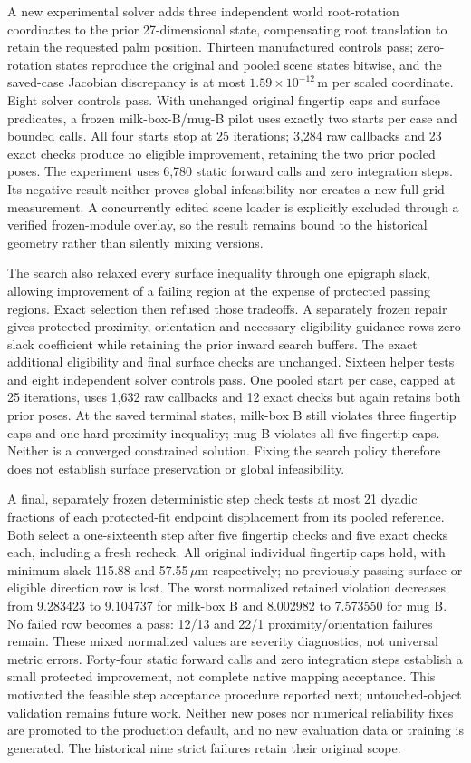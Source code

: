 \documentclass[10pt,letterpaper]{article}
\begin{document}
A new experimental solver adds three independent world root-rotation
coordinates to the prior 27-dimensional state, compensating root translation
to retain the requested palm position. Thirteen manufactured controls pass;
zero-rotation states reproduce the original and pooled scene states bitwise,
and the saved-case Jacobian discrepancy is at most
$1.59\times10^{-12}$\,m per scaled coordinate. Eight solver controls pass.
With unchanged original fingertip caps and surface predicates, a frozen
milk-box-B/mug-B pilot uses exactly two starts per case and bounded calls.
All four starts stop at 25 iterations; 3,284 raw callbacks and 23 exact checks
produce no eligible improvement, retaining the two prior pooled poses.
The experiment uses 6,780 static forward calls and zero integration steps.
Its negative result neither proves global infeasibility nor creates a new
full-grid measurement. A concurrently edited scene loader is explicitly
excluded through a verified frozen-module overlay, so the result remains
bound to the historical geometry rather than silently mixing versions.

The search also relaxed every surface inequality through one epigraph slack,
allowing improvement of a failing region at the expense of protected passing
regions. Exact selection then refused those tradeoffs. A separately frozen
repair gives protected proximity, orientation and necessary eligibility-guidance
rows zero slack coefficient while retaining the prior inward search buffers.
The exact additional eligibility and final surface checks are unchanged.
Sixteen helper tests and eight independent solver controls pass. One pooled
start per case, capped at 25 iterations, uses 1,632 raw callbacks and 12 exact
checks but again retains both prior poses. At the saved terminal states,
milk-box B still violates three fingertip caps and one hard proximity
inequality; mug B violates all five fingertip caps. Neither is a converged
constrained solution. Fixing the search policy therefore does not establish
surface preservation or global infeasibility.

A final, separately frozen deterministic step check tests at most 21 dyadic
fractions of each protected-fit endpoint displacement from its pooled reference.
Both select a one-sixteenth step after five fingertip checks and five exact
checks each, including a fresh recheck. All original individual fingertip caps
hold, with minimum slack 115.88 and 57.55\,$\mu$m respectively; no previously
passing surface or eligible direction row is lost. The worst normalized
retained violation decreases from 9.283423 to 9.104737 for milk-box B and
8.002982 to 7.573550 for mug B. No failed row becomes a pass: 12/13 and 22/1
proximity/orientation failures remain. These mixed normalized values are
severity diagnostics, not universal metric errors. Forty-four static forward
calls and zero integration steps establish a small protected improvement, not
complete native mapping acceptance. This motivated the feasible step
acceptance procedure reported next; untouched-object validation remains
future work. Neither new poses nor numerical reliability fixes are
promoted to the production default, and no new evaluation data or training is
generated. The historical nine strict failures retain their original scope.
\end{document}

